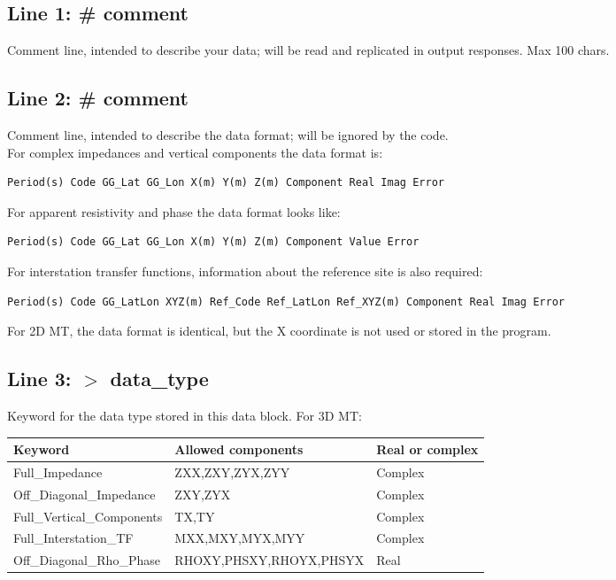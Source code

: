 \documentclass[12pt]{article}
\begin{document}
\subsection*{Line 1: \# comment}
Comment line, intended to describe your data; will be read and replicated in output responses. Max 100 chars.

\subsection*{Line 2: \# comment}
Comment line, intended to describe the data format; will be ignored by the code. \\

For complex impedances and vertical components the data format is:
\begin{verbatim}
Period(s) Code GG_Lat GG_Lon X(m) Y(m) Z(m) Component Real Imag Error
\end{verbatim}

For apparent resistivity and phase the data format looks like:
\begin{verbatim}
Period(s) Code GG_Lat GG_Lon X(m) Y(m) Z(m) Component Value Error
\end{verbatim}

For interstation transfer functions, information about the reference site is also required:
\begin{verbatim}
Period(s) Code GG_LatLon XYZ(m) Ref_Code Ref_LatLon Ref_XYZ(m) Component Real Imag Error
\end{verbatim}

For 2D MT, the data format is identical, but the X coordinate is not used or stored in the program.

\subsection*{Line 3: $>$ data\_type}
Keyword for the data type stored in this data block. For 3D MT:\\

\noindent
\begin{tabular}{|p{5cm}|p{7.5cm}|p{3.5cm}|}
  \hline
  Keyword & Allowed components & Real or complex \\
  \hline
  Full\_Impedance & ZXX,ZXY,ZYX,ZYY & Complex \\
  Off\_Diagonal\_Impedance & ZXY,ZYX & Complex \\
  Full\_Vertical\_Components & TX,TY & Complex \\
  Full\_Interstation\_TF & MXX,MXY,MYX,MYY & Complex \\
  Off\_Diagonal\_Rho\_Phase & RHOXY,PHSXY,RHOYX,PHSYX & Real \\
  \hline
\end{tabular}\\
\end{document}
